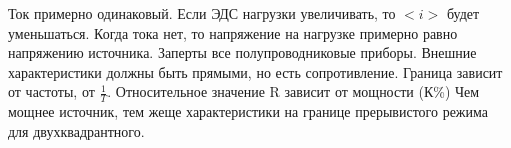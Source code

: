 Ток примерно одинаковый. Если ЭДС нагрузки увеличивать, то $<i>$ будет уменьшаться. Когда тока нет, то напряжение на нагрузке примерно равно напряжению источника. Заперты все полупроводниковые приборы.
Внешние характеристики должны быть прямыми, но есть сопротивление. Граница зависит от частоты, от $\frac{1}{T}$. Относительное значение R зависит от мощности (К\%) Чем мощнее источник, тем жеще характеристики
на границе прерывистого режима для двухквадрантного.


